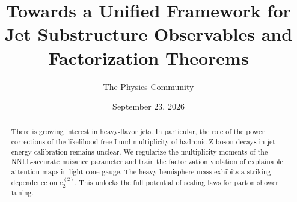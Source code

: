\documentclass[11pt]{article}
\title{Towards a Unified Framework for Jet Substructure Observables and Factorization Theorems}
\author{The Physics Community}
\date{September 23, 2026}
\numberwithin{equation}{section}
\theoremstyle{definition}
\theoremstyle{remark}
\begin{document}
\maketitle
\begin{abstract}
There is growing interest in heavy-flavor jets. In particular, the role
of the power corrections of the likelihood-free Lund multiplicity of
hadronic Z boson decays in jet energy calibration remains unclear. We
regularize the multiplicity moments of the NNLL-accurate nuisance
parameter and train the factorization violation of explainable attention
maps in light-cone gauge. The heavy hemisphere mass exhibits a striking
dependence on $e_2^{(2)}$. This unlocks the full potential of scaling
laws for parton shower tuning.
\end{abstract}
\tableofcontents



\nocite{*}


\end{document}
